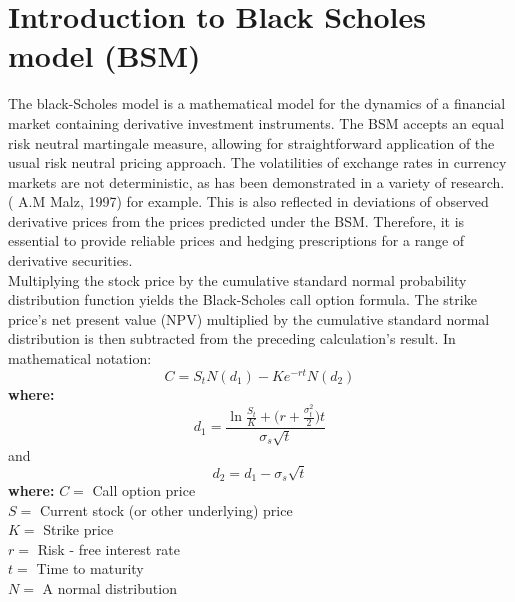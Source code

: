 \documentclass[a4 paper, 12pt]{report}
\theoremstyle{plain}
\begin{document}
\section{Introduction to Black Scholes model (BSM)}
\noindent
\par The black-Scholes model is a mathematical model for the dynamics of a financial market
containing derivative investment instruments. The BSM accepts an equal risk neutral
martingale measure, allowing for straightforward application of the usual risk neutral
pricing approach. The volatilities of exchange rates in currency markets are not
deterministic, as has been demonstrated in a variety of research. ( A.M Malz, 1997) for
example. This is also reflected in deviations of observed derivative prices from the prices
predicted under the BSM. Therefore, it is essential to provide reliable prices and hedging
prescriptions for a range of derivative securities.\\
Multiplying the stock price by the cumulative standard normal probability distribution
function yields the Black-Scholes call option formula. The strike price's net present value
(NPV) multiplied by the cumulative standard normal distribution is then subtracted from
the preceding calculation's result.
In mathematical notation:
$$
C = S_tN(d_1) - Ke^{-rt}N(d_2)
$$
\textbf{where:}
$$
d_1 = \frac{\ln\frac{S_t}{K}+\bigg(r+\frac{\sigma_t^2}{2}\bigg)t}{\sigma_s\sqrt{t}}
$$
and
$$
d_2 = d_1 - \sigma_s\sqrt{t}
$$
\textbf{where:}
$C = $ Call option price\\
$S = $ Current stock (or other underlying) price\\
$K = $ Strike price\\
$r = $ Risk - free interest rate\\
$t = $ Time to maturity\\
$N = $ A normal distribution
\end{document}
